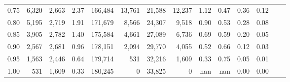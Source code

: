 \begin{tabular}{rrrrrrrrrrrrrr}
0.75 &   6,320 &  2,663 &    2.37 &  166,484 &   13,761 &  21,588 &  12,237 &  1.12 &  0.47 &  0.36 &      0.12 \\
0.80 &   5,195 &  2,719 &    1.91 &  171,679 &    8,566 &  24,307 &   9,518 &  0.90 &  0.53 &  0.28 &      0.08 \\
0.85 &   3,905 &  2,782 &    1.40 &  175,584 &    4,661 &  27,089 &   6,736 &  0.69 &  0.59 &  0.20 &      0.05 \\
0.90 &   2,567 &  2,681 &    0.96 &  178,151 &    2,094 &  29,770 &   4,055 &  0.52 &  0.66 &  0.12 &      0.03 \\
0.95 &   1,563 &  2,446 &    0.64 &  179,714 &      531 &  32,216 &   1,609 &  0.33 &  0.75 &  0.05 &      0.01 \\
1.00 &     531 &  1,609 &    0.33 &  180,245 &        0 &  33,825 &       0 &   nan &   nan &  0.00 &      0.00 \\
\bottomrule
\end{tabular}
